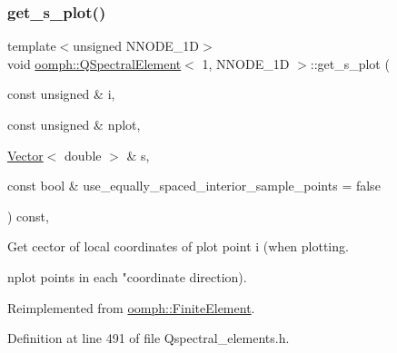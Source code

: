 \subsubsection{\texorpdfstring{get\+\_\+s\+\_\+plot()}{get\_s\_plot()}}
{\footnotesize\ttfamily template$<$unsigned N\+N\+O\+D\+E\+\_\+1D$>$ \\
void \hyperlink{classoomph_1_1QSpectralElement}{oomph\+::\+Q\+Spectral\+Element}$<$ 1, N\+N\+O\+D\+E\+\_\+1D $>$\+::get\+\_\+s\+\_\+plot (\begin{DoxyParamCaption}\item[{const unsigned \&}]{i,  }\item[{const unsigned \&}]{nplot,  }\item[{\hyperlink{classoomph_1_1Vector}{Vector}$<$ double $>$ \&}]{s,  }\item[{const bool \&}]{use\+\_\+equally\+\_\+spaced\+\_\+interior\+\_\+sample\+\_\+points = {\ttfamily false} }\end{DoxyParamCaption}) const\hspace{0.3cm}{\ttfamily [inline]}, {\ttfamily [virtual]}}



Get cector of local coordinates of plot point i (when plotting. 

nplot points in each "coordinate direction). 

Reimplemented from \hyperlink{classoomph_1_1FiniteElement_a82da844fd3ebb2005842464cdc148a03}{oomph\+::\+Finite\+Element}.



Definition at line 491 of file Qspectral\+\_\+elements.\+h.

\mbox{\label{classoomph_1_1QSpectralElement_3_011_00_01NNODE__1D_01_4_a0b5a8d5092c514611704fd4aa259fbfc}} 
